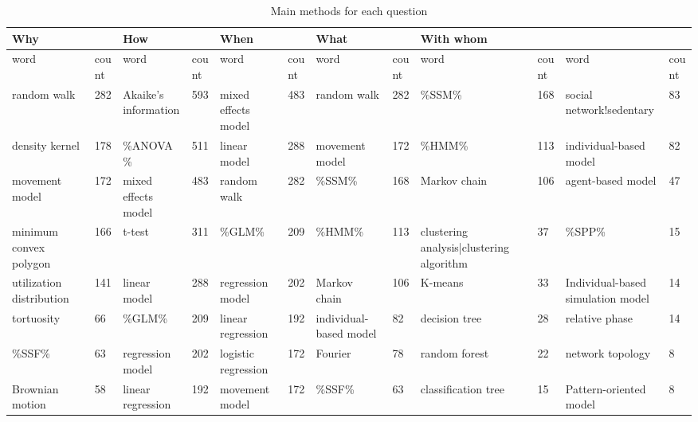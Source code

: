 \documentclass[9pt,twocolumn,twoside,lineno]{pnas-new}
\begin{document}
\begin{table}%
\centering
\caption{Main methods for each question}
\begin{tabular}{llllllllllll}
Why & & How & & When & & What & & With whom & \\
\midrule
word                     & count & word                 & count & word                & count & word                   & count & word                                     & count & word                              & count \\
\midrule
random walk              & 282   & Akaike's information & 593   & mixed effects model & 483   & random walk            & 282   & \%SSM\%                                  & 168   & social network!sedentary          & 83    \\
density kernel           & 178   & \%ANOVA\%            & 511   & linear model        & 288   & movement model         & 172   & \%HMM\%                                  & 113   & individual-based model            & 82    \\
movement model           & 172   & mixed effects model  & 483   & random walk         & 282   & \%SSM\%                & 168   & Markov chain                             & 106   & agent-based model                 & 47    \\
minimum convex polygon   & 166   & t-test               & 311   & \%GLM\%             & 209   & \%HMM\%                & 113   & clustering analysis|clustering algorithm & 37    & \%SPP\%                           & 15    \\
utilization distribution & 141   & linear model         & 288   & regression model    & 202   & Markov chain           & 106   & K-means                                  & 33    & Individual-based simulation model & 14    \\
tortuosity               & 66    & \%GLM\%              & 209   & linear regression   & 192   & individual-based model & 82    & decision tree                            & 28    & relative phase                    & 14    \\
\%SSF\%                  & 63    & regression model     & 202   & logistic regression & 172   & Fourier                & 78    & random forest                            & 22    & network topology                  & 8     \\
Brownian motion          & 58    & linear regression    & 192   & movement model      & 172   & \%SSF\%                & 63    & classification tree                      & 15    & Pattern-oriented model            & 8     \\

\end{tabular}
\end{table}
\end{document}
